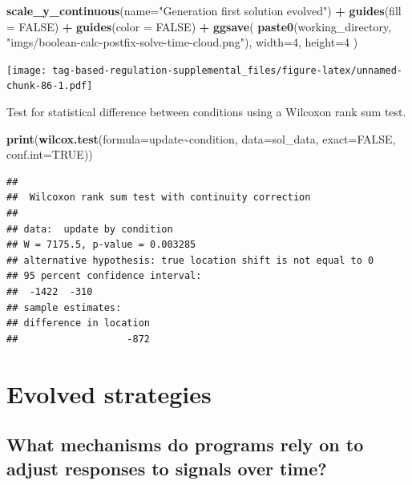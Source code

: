 \documentclass[
]{book}
\newenvironment{Shaded}{\begin{snugshade}}{\end{snugshade}}
\newcommand{\DataTypeTok}[1]{\textcolor[rgb]{0.13,0.29,0.53}{#1}}
\newcommand{\DecValTok}[1]{\textcolor[rgb]{0.00,0.00,0.81}{#1}}
\newcommand{\KeywordTok}[1]{\textcolor[rgb]{0.13,0.29,0.53}{\textbf{#1}}}
\newcommand{\NormalTok}[1]{#1}
\newcommand{\OperatorTok}[1]{\textcolor[rgb]{0.81,0.36,0.00}{\textbf{#1}}}
\newcommand{\OtherTok}[1]{\textcolor[rgb]{0.56,0.35,0.01}{#1}}
\newcommand{\StringTok}[1]{\textcolor[rgb]{0.31,0.60,0.02}{#1}}
\begin{document}
\begin{Shaded}
\begin{Highlighting}[]
\StringTok{  }\KeywordTok{scale\_y\_continuous}\NormalTok{(}\DataTypeTok{name=}\StringTok{"Generation first solution evolved"}\NormalTok{) }\OperatorTok{+}
\StringTok{  }\KeywordTok{guides}\NormalTok{(}\DataTypeTok{fill =} \OtherTok{FALSE}\NormalTok{) }\OperatorTok{+}
\StringTok{  }\KeywordTok{guides}\NormalTok{(}\DataTypeTok{color =} \OtherTok{FALSE}\NormalTok{) }\OperatorTok{+}
\StringTok{  }\KeywordTok{ggsave}\NormalTok{(}
    \KeywordTok{paste0}\NormalTok{(working\_directory, }\StringTok{"imgs/boolean{-}calc{-}postfix{-}solve{-}time{-}cloud.png"}\NormalTok{),}
    \DataTypeTok{width=}\DecValTok{4}\NormalTok{,}
    \DataTypeTok{height=}\DecValTok{4}
\NormalTok{  )}
\end{Highlighting}
\end{Shaded}

\texttt{[image: tag-based-regulation-supplemental\_files/figure-latex/unnamed-chunk-86-1.pdf]}

Test for statistical difference between conditions using a Wilcoxon rank sum test.

\begin{Shaded}
\begin{Highlighting}[]
\KeywordTok{print}\NormalTok{(}\KeywordTok{wilcox.test}\NormalTok{(}\DataTypeTok{formula=}\NormalTok{update}\OperatorTok{\textasciitilde{}}\NormalTok{condition, }\DataTypeTok{data=}\NormalTok{sol\_data, }\DataTypeTok{exact=}\OtherTok{FALSE}\NormalTok{, }\DataTypeTok{conf.int=}\OtherTok{TRUE}\NormalTok{))}
\end{Highlighting}
\end{Shaded}

\begin{verbatim}
## 
##  Wilcoxon rank sum test with continuity correction
## 
## data:  update by condition
## W = 7175.5, p-value = 0.003285
## alternative hypothesis: true location shift is not equal to 0
## 95 percent confidence interval:
##  -1422  -310
## sample estimates:
## difference in location 
##                   -872
\end{verbatim}

\hypertarget{evolved-strategies-2}{%
\section{Evolved strategies}\label{evolved-strategies-2}}

\hypertarget{what-mechanisms-do-programs-rely-on-to-adjust-responses-to-signals-over-time-2}{%
\subsection{What mechanisms do programs rely on to adjust responses to signals over time?}\label{what-mechanisms-do-programs-rely-on-to-adjust-responses-to-signals-over-time-2}}
\end{document}
